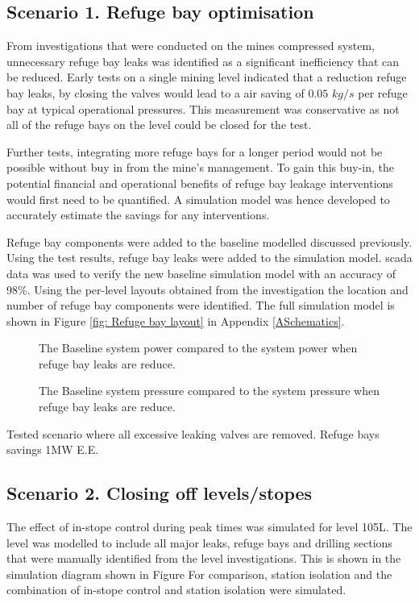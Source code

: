 	\subsection{Scenario 1. Refuge bay optimisation}
	From investigations that were conducted on the mines compressed system, unnecessary refuge bay leaks was identified as a significant inefficiency that can be reduced. Early tests on a single mining level indicated that a reduction refuge bay leaks, by closing the valves would lead to a air saving of $0.05$ $kg/s$ per refuge bay at typical operational pressures. This measurement was conservative as not all of the refuge bays on the level could be closed for the test.
	\par 
	Further tests, integrating more refuge bays for a longer period would not be possible without buy in from the mine's management. To gain this buy-in, the potential financial and operational benefits of refuge bay leakage interventions would first need to be quantified. A simulation model was hence developed to accurately estimate the savings for any interventions.
	\par
	Refuge bay components were added to the baseline modelled discussed previously. Using the test results, refuge bay leaks were added to the simulation model. \gls{scada} data was used to verify the new baseline simulation model with an accuracy of 98\%. Using the per-level layouts obtained from the investigation the location and number of refuge bay components were identified. The full simulation model is shown in Figure \ref{fig: Refuge bay layout} in Appendix \ref{ASchematics}.
	\par 
	
	\begin{figure}[h]
		\centering
		\fbox{}
		\caption{The Baseline system power compared to the system power when refuge bay leaks are reduce.}
		\label{fig: RefugeBay Power.}
	\end{figure}   

	\begin{figure}[h]
		\centering
		\fbox{}
		\caption{The Baseline system pressure compared to the system pressure when refuge bay leaks are reduce.}
		\label{fig: RefugeBay Pressures.}
	\end{figure}  
	Tested scenario where all excessive leaking valves are removed.
	Refuge bays savings 1MW E.E.
	
	\subsection{Scenario 2. Closing off levels/stopes}
	The effect of in-stope control during peak times was simulated for level 105L. The level was modelled to include all major leaks, refuge bays and drilling sections that were manually identified from the level investigations. This is shown in the simulation diagram shown in Figure For comparison, station isolation and the combination of in-stope control and station isolation were simulated. 
	
